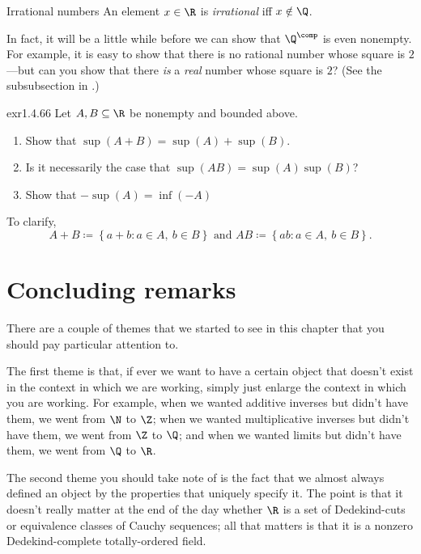 \begin{dfn}{Irrational numbers}{}
An element $x\in \R$ is \emph{irrational} iff $x\notin \Q$.
\begin{rmk}
In fact, it will be a little while before we can show that $\Q ^{\comp}$ is even nonempty.  For example, it is easy to show that there is no rational number whose square is $2$---but can you show that there \emph{is} a \emph{real} number whose square is $2$?  (See the subsubsection  in .)
\end{rmk}
\end{dfn}

\begin{exr}{}{exr1.4.66}
Let $A,B\subseteq \R$ be nonempty and bounded above.
\begin{enumerate}
\item Show that $\sup (A+B)=\sup (A)+\sup (B)$.
\item Is it necessarily the case that $\sup (AB)=\sup (A)\sup (B)$?
\item Show that $-\sup (A)=\inf (-A)$
\end{enumerate}
\begin{rmk}
To clarify,
\begin{equation}
A+B\coloneqq \left\{ a+b:a\in A,\ b\in B\right\} \text{ and }AB\coloneqq \left\{ ab:a\in A,\ b\in B\right\} .
\end{equation}
\end{rmk}
\end{exr}

\section{Concluding remarks}

There are a couple of themes that we started to see in this chapter that you should pay particular attention to.

The first theme is that, if ever we want to have a certain object that doesn't exist in the context in which we are working, simply just enlarge the context in which you are working.  For example, when we wanted additive inverses but didn't have them, we went from $\N$ to $\Z$; when we wanted multiplicative inverses but didn't have them, we went from $\Z$ to $\Q$; and when we wanted limits but didn't have them, we went from $\Q$ to $\R$.

The second theme you should take note of is the fact that we almost always defined an object by the properties that uniquely specify it.  The point is that it doesn't really matter at the end of the day whether $\R$ is a set of Dedekind-cuts or equivalence classes of Cauchy sequences; all that matters is that it is a nonzero Dedekind-complete totally-ordered field.

